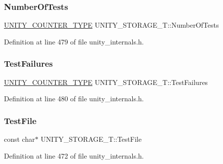 \subsubsection{\texorpdfstring{Number\+Of\+Tests}{NumberOfTests}}
{\footnotesize\ttfamily \hyperlink{unity__internals_8h_ab5186738706785ae0189b382e45911d9}{U\+N\+I\+T\+Y\+\_\+\+C\+O\+U\+N\+T\+E\+R\+\_\+\+T\+Y\+PE} U\+N\+I\+T\+Y\+\_\+\+S\+T\+O\+R\+A\+G\+E\+\_\+\+T\+::\+Number\+Of\+Tests}



Definition at line 479 of file unity\+\_\+internals.\+h.

\mbox{\label{struct_u_n_i_t_y___s_t_o_r_a_g_e___t_a6a5463da7d0010ce4f9d80ff0647c7d4}} 
\subsubsection{\texorpdfstring{Test\+Failures}{TestFailures}}
{\footnotesize\ttfamily \hyperlink{unity__internals_8h_ab5186738706785ae0189b382e45911d9}{U\+N\+I\+T\+Y\+\_\+\+C\+O\+U\+N\+T\+E\+R\+\_\+\+T\+Y\+PE} U\+N\+I\+T\+Y\+\_\+\+S\+T\+O\+R\+A\+G\+E\+\_\+\+T\+::\+Test\+Failures}



Definition at line 480 of file unity\+\_\+internals.\+h.

\mbox{\label{struct_u_n_i_t_y___s_t_o_r_a_g_e___t_a69613e2d9945fc1ce5a4848613828a1f}} 
\subsubsection{\texorpdfstring{Test\+File}{TestFile}}
{\footnotesize\ttfamily const char$\ast$ U\+N\+I\+T\+Y\+\_\+\+S\+T\+O\+R\+A\+G\+E\+\_\+\+T\+::\+Test\+File}



Definition at line 472 of file unity\+\_\+internals.\+h.

